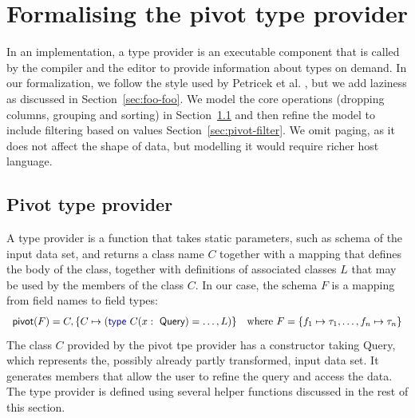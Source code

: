 \documentclass[a4paper,UKenglish]{lipics-v2016}
\theoremstyle{plain}
\theoremstyle{definition}
\newcommand{\kvd}[1]{\textnormal{\textcolor{kvdclr}{\sffamily #1}}}
\newcommand{\ident}[1]{\textnormal{\sffamily #1}}
\begin{document}

\section{Formalising the pivot type provider}
\label{sec:pivot}

In an implementation, a type provider is an executable component that is called by the compiler
and the editor to provide information about types on demand. In our formalization, we follow the 
style used by Petricek et al. \cite{fsdata}, but we add laziness as discussed in Section~\ref{sec:foo-foo}.
We model the core operations (dropping columns, grouping and sorting) in Section~\ref{sec:pivot-core}
and then refine the model to include filtering based on values Section~\ref{sec:pivot-filter}.
We omit paging, as it does not affect the shape of data, but modelling it would require richer 
host language.


\subsection{Pivot type provider}
\label{sec:pivot-core}

A type provider is a function that takes static parameters, such as schema of the input data set, 
and returns a class name $C$ together with a mapping that defines the body of the class, together 
with definitions of associated classes $L$ that may be used by the members of the class $C$. 
In our case, the schema $F$ is a mapping from field names to field types:
%
\begin{equation*}
\begin{array}{l}
\ident{pivot}(F) = C, \{ C \mapsto (\kvd{type}~C(x:\ident{Query}) = \ldots,L) \} \quad \textnormal{where}~F=\{ f_1 \mapsto \tau_1, \ldots, f_n \mapsto \tau_n \}
\end{array}
\end{equation*}
%
The class $C$ provided by the pivot tpe provider has a constructor taking \ident{Query}, which 
represents the, possibly already partly transformed, input data set. It generates members that
allow the user to refine the query and access the data. The type provider is defined using several
helper functions discussed in the rest of this section.
\end{document}
